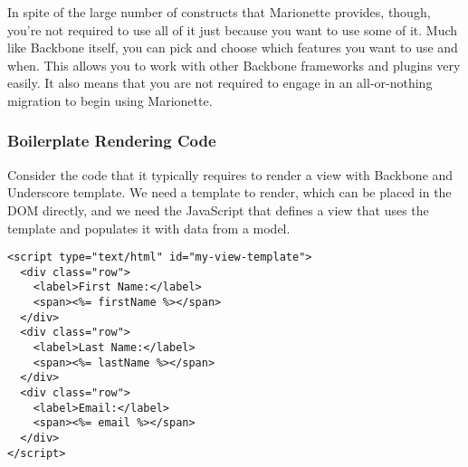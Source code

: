 \documentclass[9pt]{book}
\newenvironment{Shaded}{}{}
\newcommand{\KeywordTok}[1]{\textcolor[rgb]{0.00,0.44,0.13}{\textbf{{#1}}}}
\newcommand{\DataTypeTok}[1]{\textcolor[rgb]{0.56,0.13,0.00}{{#1}}}
\newcommand{\StringTok}[1]{\textcolor[rgb]{0.25,0.44,0.63}{{#1}}}
\newcommand{\CommentTok}[1]{\textcolor[rgb]{0.38,0.63,0.69}{\textit{{#1}}}}
\newcommand{\OtherTok}[1]{\textcolor[rgb]{0.00,0.44,0.13}{{#1}}}
\newcommand{\FunctionTok}[1]{\textcolor[rgb]{0.02,0.16,0.49}{{#1}}}
\newcommand{\NormalTok}[1]{{#1}}
\begin{document}
In spite of the large number of constructs that Marionette provides,
though, you're not required to use all of it just because you want to
use some of it. Much like Backbone itself, you can pick and choose which
features you want to use and when. This allows you to work with other
Backbone frameworks and plugins very easily. It also means that you are
not required to engage in an all-or-nothing migration to begin using
Marionette.

\subsubsection{Boilerplate Rendering
Code}\label{boilerplate-rendering-code}

Consider the code that it typically requires to render a view with
Backbone and Underscore template. We need a template to render, which
can be placed in the DOM directly, and we need the JavaScript that
defines a view that uses the template and populates it with data from a
model.

\begin{verbatim}
<script type="text/html" id="my-view-template">
  <div class="row">
    <label>First Name:</label>
    <span><%= firstName %></span>
  </div>
  <div class="row">
    <label>Last Name:</label>
    <span><%= lastName %></span>
  </div>
  <div class="row">
    <label>Email:</label>
    <span><%= email %></span>
  </div>
</script>
\end{verbatim}

\begin{Shaded}
\end{Shaded}
\end{document}
